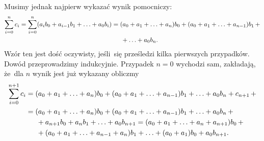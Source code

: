 \documentclass[a4paper,11pt]{article}
\begin{document}
Musimy jednak najpierw wykazać wynik pomocniczy:
\begin{equation}
  \label{eq:Leja-Funkcje-zespolone-22}
  \begin{split}
    \sum_{ i = 0 }^{ n } c_{ i } = \sum_{ i = 0 }^{ n } ( a_{ i } b_{
    0 } + a_{ i - 1 } b_{ 1 } + \ldots + a_{ 0 } b_{ i } )
    &= ( a_{ 0 } + a_{ 1 } + \ldots + a_{ n } ) b_{ 0 } + ( a_{ 0 } + a_{ 1 }
      + \ldots + a_{ n - 1 } ) b_{ 1 } \, + \\
    &\hspace{1.5em} + \ldots + a_{ 0 } b_{ n }.
  \end{split}
\end{equation}
Wzór ten jest dość oczywisty, jeśli~się prześledzi kilka pierwszych
przypadków. Dowód przeprowadzimy indukcyjnie. Przypadek $n = 0$
wychodzi sam, zakładają, że~dla $n$ wynik jest już wykazany obliczmy
\begin{equation}
  \label{eq:Leja-Funkcje-zespolone-23}
  \begin{split}
    \sum_{ i = 0 }^{ n + 1 } c_{ i }
    &= ( a_{ 0 } + a_{ 1 } + \ldots +
      a_{ n } ) b_{ 0 } + ( a_{ 0 } + a_{ 1 } + \ldots + a_{ n - 1 } ) b_{
      1 } + \ldots + a_{ 0 } b_{ n } + c_{ n + 1 } \, + \\
    &= ( a_{ 0 } + a_{ 1 } + \ldots + a_{ n } ) b_{ 0 } + ( a_{ 0 } + a_{
      1 }
      + \ldots + a_{ n - 1 } ) b_{ 1 } + \ldots + a_{ 0 } b_{ n } \, + \\
    &\hspace{1.5em}
      + a_{ n + 1 } b_{ 0 } + a_{ n } b_{ 1 } + \ldots + a_{ 0 } b_{ n + 1 } =
      ( a_{ 0 } + a_{ 1 } + \ldots + a_{ n } + a_{ n + 1 } ) b_{ 0 } \, + \\
    &\hspace{1.5em} + ( a_{ 0 } + a_{ 1 } + \ldots + a_{ n - 1 } + a_{ n } ) b_{ 1 }
      + \ldots + ( a_{ 0 } + a_{ 1 } ) b_{ 0 } + a_{ 0 } b_{ n + 1 }.
  \end{split}
\end{equation}
\end{document}
